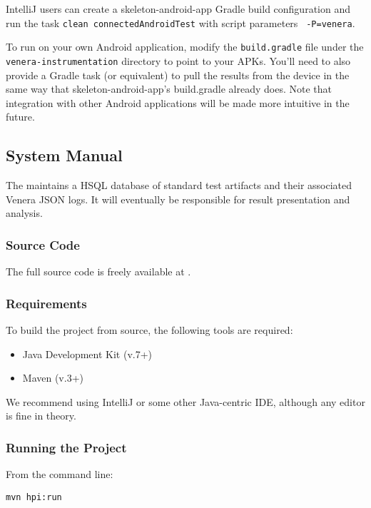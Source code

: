 IntelliJ users can create a skeleton-android-app Gradle build configuration and
run the task {\tt clean connectedAndroidTest} with script parameters {\tt
-P=venera}.

To run \venera on your own Android application, modify the {\tt build.gradle}
file under the {\tt venera-instrumentation} directory to point to your APKs.
You'll need to also provide a Gradle task (or equivalent) to pull the results
from the device in the same way that skeleton-android-app's build.gradle already
does. Note that integration with other Android applications will be made more
intuitive in the future.


\subsection{\jenkinsPlugin System Manual}

The \jenkinsPlugin maintains a HSQL database of standard test artifacts
and their associated Venera JSON logs. It will eventually be responsible for
\venera result presentation and analysis.

\subsubsection{Source Code}

The full source code is freely available at \cite{heisentestPlugin}.

\subsubsection{Requirements}

To build the project from source, the following tools are required:

\begin{itemize}
  \item Java Development Kit (v.7+) \cite{jdk}
  \item Maven (v.3+) \cite{maven}
\end{itemize}

We recommend using IntelliJ \cite{intellij} or some other Java-centric IDE,
although any editor is fine in theory.

\subsubsection{Running the Project}

From the command line:

\begin{lstlisting}[numbers=none]
mvn hpi:run
\end{lstlisting}

